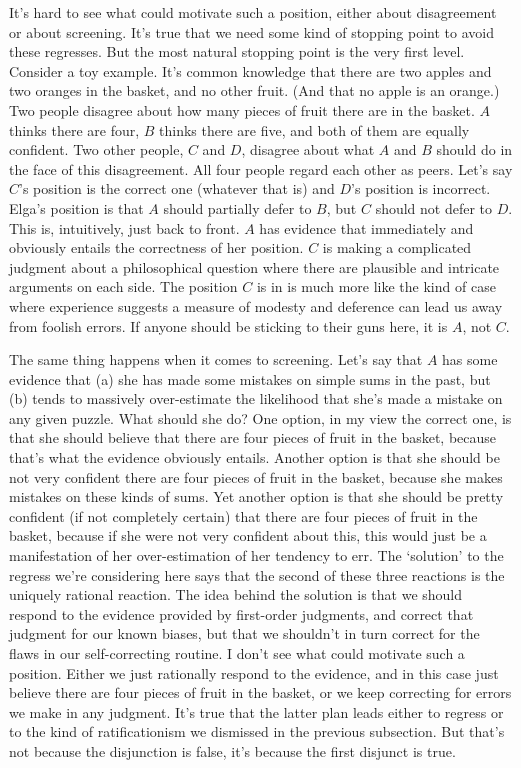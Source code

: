 It's hard to see what could motivate such a position, either about disagreement or about screening. It's true that we need some kind of stopping point to avoid these regresses. But the most natural stopping point is the very first level. Consider a toy example. It's common knowledge that there are two apples and two oranges in the basket, and no other fruit. (And that no apple is an orange.) Two people disagree about how many pieces of fruit there are in the basket. \(A\) thinks there are four, \(B\) thinks there are five, and both of them are equally confident. Two other people, \(C\) and \(D\), disagree about what \(A\) and \(B\) should do in the face of this disagreement. All four people regard each other as peers. Let's say \(C\)'s position is the correct one (whatever that is) and \(D\)'s position is incorrect. Elga's position is that \(A\) should partially defer to \(B\), but \(C\) should not defer to \(D\). This is, intuitively, just back to front. \(A\) has evidence that immediately and obviously entails the correctness of her position. \(C\) is making a complicated judgment about a philosophical question where there are plausible and intricate arguments on each side. The position \(C\) is in is much more like the kind of case where experience suggests a measure of modesty and deference can lead us away from foolish errors. If anyone should be sticking to their guns here, it is \(A\), not \(C\).

The same thing happens when it comes to screening. Let's say that \(A\) has some evidence that (a) she has made some mistakes on simple sums in the past, but (b) tends to massively over-estimate the likelihood that she's made a mistake on any given puzzle. What should she do? One option, in my view the correct one, is that she should believe that there are four pieces of fruit in the basket, because that's what the evidence obviously entails. Another option is that she should be not very confident there are four pieces of fruit in the basket, because she makes mistakes on these kinds of sums. Yet another option is that she should be pretty confident (if not completely certain) that there are four pieces of fruit in the basket, because if she were not very confident about this, this would just be a manifestation of her over-estimation of her tendency to err. The `solution' to the regress we're considering here says that the second of these three reactions is the uniquely rational reaction. The idea behind the solution is that we should respond to the evidence provided by first-order judgments, and correct that judgment for our known biases, but that we shouldn't in turn correct for the flaws in our self-correcting routine. I don't see what could motivate such a position. Either we just rationally respond to the evidence, and in this case just believe there are four pieces of fruit in the basket, or we keep correcting for errors we make in any judgment. It's true that the latter plan leads either to regress or to the kind of ratificationism we dismissed in the previous subsection. But that's not because the disjunction is false, it's because the first disjunct is true.

